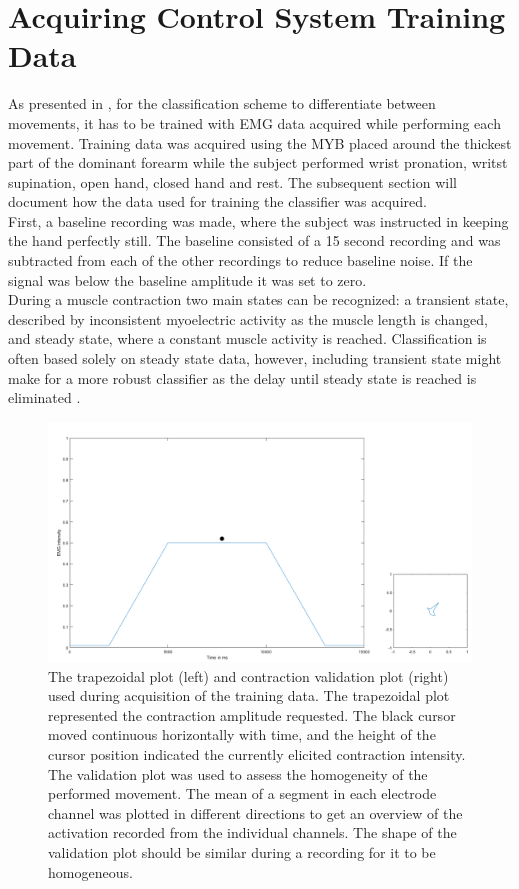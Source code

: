 
\section{Acquiring Control System Training Data}

As presented in , for the classification scheme to differentiate between movements, it has to be trained with EMG data acquired while performing each movement. Training data was acquired using the MYB placed around the thickest part of the dominant forearm while the subject performed wrist pronation, writst supination, open hand, closed hand and rest. The subsequent section will document how the data used for training the classifier was acquired. \\
First, a baseline recording was made, where the subject was instructed in keeping the hand perfectly still. The baseline consisted of a 15 second recording and was subtracted from each of the other recordings to reduce baseline noise. If the signal was below the baseline amplitude it was set to zero. \\
During a muscle contraction two main states can be recognized: a transient state, described by inconsistent myoelectric activity as the muscle length is changed, and steady state, where a constant muscle activity is reached. \cite{Mobarak2014} Classification is often based solely on steady state data, however, including transient state might make for a more robust classifier as the delay until steady state is reached is eliminated \cite{Boschmann2013,Mobarak2014a}. \\
%

\begin{figure}[H]                 
	\includegraphics[width=1\textwidth]{figures/trapezoid}  
	\caption{The trapezoidal plot (left) and contraction validation plot (right) used during acquisition of the training data. The trapezoidal plot represented the contraction amplitude requested. The black cursor moved continuous horizontally with time, and the height of the cursor position indicated the currently elicited contraction intensity. The validation plot was used to assess the homogeneity of the performed movement. The mean of a segment in each electrode channel was plotted in different directions to get an overview of the activation recorded from the individual channels. The shape of the validation plot should be similar during a recording for it to be homogeneous.}
	\label{fig:GUI} 
\end{figure}
\vspace{-1em}

